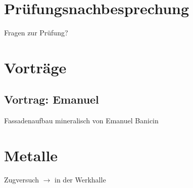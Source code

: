 \section{Prüfungsnachbesprechung}
\BlueSectionSlide
{}
\begin{frame}{Fragen zur Prüfung?}
\end{frame}

\section{Vorträge}
\BlueSectionSlide

\subsection{Vortrag: Emanuel}
\begin{frame}{Fassadenaufbau mineralisch}
    von Emanuel Banicin
\end{frame}


\section{Metalle}
\BlueSectionSlide
\begin{frame}{Zugversuch}
    $\rightarrow$ in der Werkhalle
\end{frame}


















